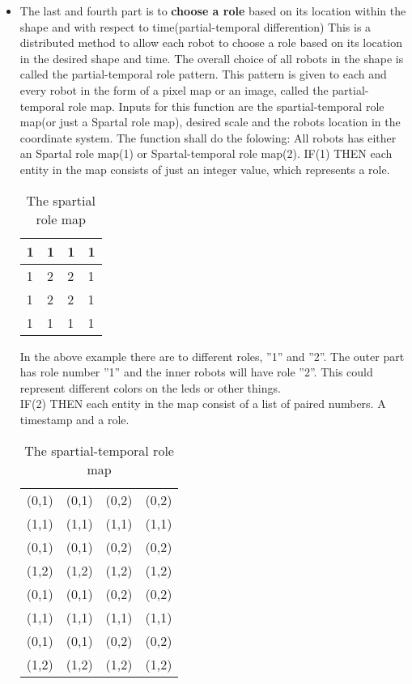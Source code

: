 \begin{itemize}
\item The last and fourth part is to \textbf{choose a role} based on its location within the shape and with respect to time(partial-temporal differention)
This is a distributed method to allow each robot to choose a role based on its location in the desired shape and time.
The overall choice of all robots in the shape is called the partial-temporal role pattern. This pattern is given to each and every robot in the form of a pixel map or an image, called the partial-temporal role map.
Inputs for this function are the spartial-temporal role map(or just a Spartal role map), desired scale and the robots location in the coordinate system. 
The function shall do the folowing: All robots has either an Spartal role map(1) or Spartal-temporal role map(2).
IF(1) THEN each entity in the map consists of just an integer value, which represents a role.
\begin{table}[h]
\caption{The spartial role map} \label{tab:numbersExample}
\begin{center}
\begin{tabular}{| l | l | l | l |}
\hline
1 & 1 & 1 & 1 \\ \hline
1 & 2 & 2 & 1 \\ \hline
1 & 2 & 2 & 1 \\ \hline
1 & 1 & 1 & 1 \\ \hline
\end{tabular}
\end{center}
\end{table}

In the above example  there are to different roles, ”1” and ”2”. The outer part has role number ”1” and the inner robots will have role ”2”. This could represent different colors on the leds or other things.\\
IF(2) THEN each entity in the map consist of a list of paired numbers. A timestamp and a role.
\begin{table}[h]
\caption{The spartial-temporal role map} \label{tab:numbersExample}
\begin{center}
\begin{tabular}{| l | l | l | l |}
\hline
(0,1) & (0,1) & (0,2) & (0,2) \\ 
(1,1) & (1,1) & (1,1) & (1,1) \\ \hline
(0,1) & (0,1) & (0,2) & (0,2) \\ 
(1,2) & (1,2) & (1,2) & (1,2) \\ \hline
(0,1) & (0,1) & (0,2) & (0,2) \\ 
(1,1) & (1,1) & (1,1) & (1,1) \\ \hline
(0,1) & (0,1) & (0,2) & (0,2) \\ 
(1,2) & (1,2) & (1,2) & (1,2) \\ \hline
\end{tabular}
\end{center}
\end{table}

\end{itemize}


